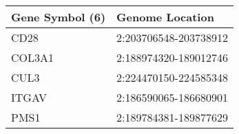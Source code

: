\begin{tabular}{ll}
\toprule
Gene Symbol (6) &       Genome Location \\
\midrule
           CD28 & 2:203706548-203738912 \\
         COL3A1 & 2:188974320-189012746 \\
           CUL3 & 2:224470150-224585348 \\
          ITGAV & 2:186590065-186680901 \\
           PMS1 & 2:189784381-189877629 \\
\bottomrule
\end{tabular}
